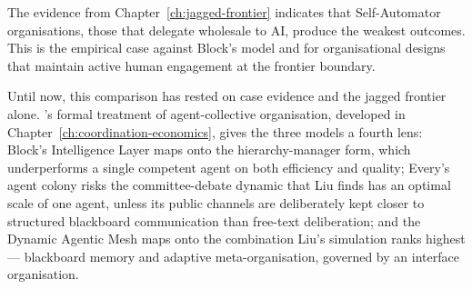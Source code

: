 The evidence from Chapter~\ref{ch:jagged-frontier} indicates that Self-Automator organisations, those that delegate wholesale to AI, produce the weakest outcomes. This is the empirical case against Block's model and for organisational designs that maintain active human engagement at the frontier boundary.

Until now, this comparison has rested on case evidence and the jagged frontier alone. \textcite{Liu2026}'s formal treatment of agent-collective organisation, developed in Chapter~\ref{ch:coordination-economics}, gives the three models a fourth lens: Block's Intelligence Layer maps onto the hierarchy-manager form, which underperforms a single competent agent on both efficiency and quality; Every's agent colony risks the committee-debate dynamic that Liu finds has an optimal scale of one agent, unless its public channels are deliberately kept closer to structured blackboard communication than free-text deliberation; and the Dynamic Agentic Mesh maps onto the combination Liu's simulation ranks highest --- blackboard memory and adaptive meta-organisation, governed by an interface organisation.
